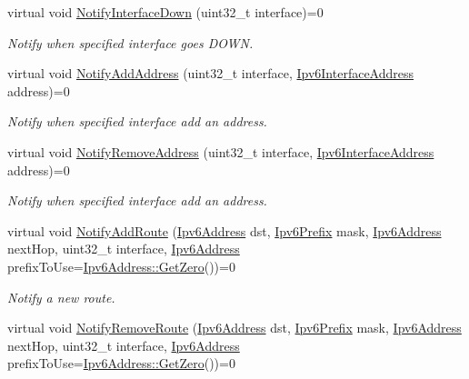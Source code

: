 \begin{DoxyCompactItemize}
virtual void \hyperlink{classns3_1_1Ipv6RoutingProtocol_aa9b4c21a3878a1b808c9ac9d26c914bf}{Notify\+Interface\+Down} (uint32\+\_\+t interface)=0
\begin{DoxyCompactList}\small\item\em Notify when specified interface goes D\+O\+WN. \end{DoxyCompactList}\item 
virtual void \hyperlink{classns3_1_1Ipv6RoutingProtocol_ae8ef31faadbb3ddd1c9a8888c986cb57}{Notify\+Add\+Address} (uint32\+\_\+t interface, \hyperlink{classns3_1_1Ipv6InterfaceAddress}{Ipv6\+Interface\+Address} address)=0
\begin{DoxyCompactList}\small\item\em Notify when specified interface add an address. \end{DoxyCompactList}\item 
virtual void \hyperlink{classns3_1_1Ipv6RoutingProtocol_a878ace2f28ea3b07417fe5751d9ec5fc}{Notify\+Remove\+Address} (uint32\+\_\+t interface, \hyperlink{classns3_1_1Ipv6InterfaceAddress}{Ipv6\+Interface\+Address} address)=0
\begin{DoxyCompactList}\small\item\em Notify when specified interface add an address. \end{DoxyCompactList}\item 
virtual void \hyperlink{classns3_1_1Ipv6RoutingProtocol_ad5fee223bfdac0b1dde05de7702a87cf}{Notify\+Add\+Route} (\hyperlink{classns3_1_1Ipv6Address}{Ipv6\+Address} dst, \hyperlink{classns3_1_1Ipv6Prefix}{Ipv6\+Prefix} mask, \hyperlink{classns3_1_1Ipv6Address}{Ipv6\+Address} next\+Hop, uint32\+\_\+t interface, \hyperlink{classns3_1_1Ipv6Address}{Ipv6\+Address} prefix\+To\+Use=\hyperlink{classns3_1_1Ipv6Address_a63a34bdb1505e05fbdd07d316d0bd7e6}{Ipv6\+Address\+::\+Get\+Zero}())=0
\begin{DoxyCompactList}\small\item\em Notify a new route. \end{DoxyCompactList}\item 
virtual void \hyperlink{classns3_1_1Ipv6RoutingProtocol_afcd129c7be3b0fb78012fa68025bf553}{Notify\+Remove\+Route} (\hyperlink{classns3_1_1Ipv6Address}{Ipv6\+Address} dst, \hyperlink{classns3_1_1Ipv6Prefix}{Ipv6\+Prefix} mask, \hyperlink{classns3_1_1Ipv6Address}{Ipv6\+Address} next\+Hop, uint32\+\_\+t interface, \hyperlink{classns3_1_1Ipv6Address}{Ipv6\+Address} prefix\+To\+Use=\hyperlink{classns3_1_1Ipv6Address_a63a34bdb1505e05fbdd07d316d0bd7e6}{Ipv6\+Address\+::\+Get\+Zero}())=0

\end{DoxyCompactItemize}
